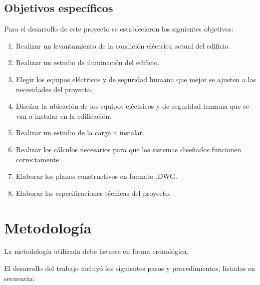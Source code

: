 \subsection{Objetivos específicos}
Para el desarrollo de este proyecto se establecieron los siguientes objetivos:

\begin{enumerate}
	\item Realizar un levantamiento de la condición eléctrica actual del edificio.
	\item Realizar un estudio de iluminación del edificio.
	\item Elegir los equipos eléctricos y de seguridad humana que mejor se ajusten a las necesidades del proyecto.
	\item Diseñar la ubicación de los equipos eléctricos y de seguridad humana que se van a instalar en la edificación.
	\item Realizar un estudio de la carga a instalar.
	\item Realizar los cálculos necesarios para que los sistemas diseñados funcionen correctamente.
	\item Elaborar los planos constructivos en formato .DWG.
	\item Elaborar las especificaciones técnicas del proyecto.
\end{enumerate}

\section{Metodología}
La metodología utilizada debe listarse en forma cronológica.

El desarrollo del trabajo incluyó los siguientes pasos y procedimientos, listados en secuencia:

